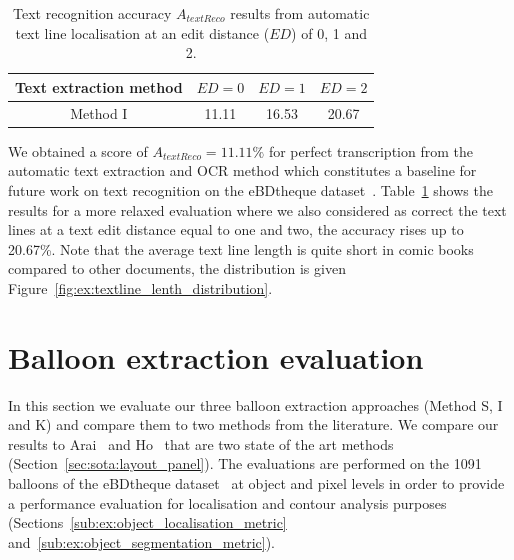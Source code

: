   \begin{table}[ht]
    \centering
    \caption[Text recognition accuracy results from automatic text line localisation using edit distance]{Text recognition accuracy $A_{textReco}$ results from automatic text line localisation at an edit distance ($ED$) of 0, 1 and 2.}
    \begin{tabular}{|c|c|c|c|}
          \hline
          Text extraction method &  $ED=0$  & $ED=1$  & $ED=2$  \\
          \hline
          Method I  &  11.11  & 16.53     & 20.67       \\
          \hline
        \end{tabular}
    \label{tab:ex:text_recogniton_results}
  \end{table}%

We obtained a score of $A_{textReco}=11.11\%$ for perfect transcription from the automatic text extraction and OCR method which constitutes a baseline for future work on text recognition on the eBDtheque dataset~\cite{Guerin2013}.
Table~\ref{tab:ex:text_recogniton_results} shows the results for a more relaxed evaluation where we also considered as correct the text lines at a text edit distance equal to one and two, the accuracy rises up to 20.67\%.
Note that the average text line length is quite short in comic books compared to other documents, the distribution is given Figure~\ref{fig:ex:textline_lenth_distribution}.




\section{Balloon extraction evaluation} %
\label{sub:ex:balloon_extraction_evaluation}
In this section we evaluate our three balloon extraction approaches (Method S, I and K) and compare them to two methods from the literature.
We compare our results to Arai~\cite{Arai10} and Ho~\cite{Ho2012} that are two state of the art methods (Section~\ref{sec:sota:layout_panel}).
The evaluations are performed on the 1091 balloons of the eBDtheque dataset~\cite{Guerin2013} at object and pixel levels in order to provide a performance evaluation for localisation and contour analysis purposes (Sections~\ref{sub:ex:object_localisation_metric} and~\ref{sub:ex:object_segmentation_metric}).

